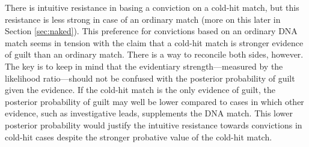 \documentclass{article}
\begin{document}

There is intuitive resistance in basing a conviction on a cold-hit match, but this resistance is less strong in case of an ordinary match (more on this later in Section \ref{sec:naked}). This preference for convictions based on an ordinary DNA match seems in tension with the claim that a cold-hit match is stronger evidence of guilt than an ordinary match. There is a way to reconcile both sides, however. The key is to keep in mind that the evidentiary strength---measured by the likelihood ratio---should not be confused with the posterior probability of guilt given the evidence. 
If the cold-hit match is the only evidence of guilt, the posterior probability of guilt may well be lower compared to cases in which other evidence, such as investigative leads, supplements the DNA match. This lower posterior probability would justify the intuitive resistance towards convictions in 
cold-hit cases despite the stronger probative value of the cold-hit match. 








\end{document}
